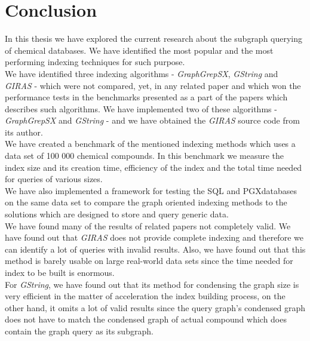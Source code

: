 \chapter*{Conclusion}

In this thesis we have explored the current research about the subgraph querying of chemical databases. We have identified the most popular and the most performing indexing techniques for such purpose.\\

We have identified three indexing algorithms - \textit{GraphGrepSX}, \textit{GString} and \textit{GIRAS} - which were not compared, yet, in any related paper and which won the performance tests in the benchmarks presented as a part of the papers which describes such algorithms. We have implemented two of these algorithms - \textit{GraphGrepSX} and \textit{GString} - and we have obtained the \textit{GIRAS} source code from its author.\\

We have created a benchmark of the mentioned indexing methods which uses a data set of 100 000 chemical compounds. In this benchmark we measure the index size and its creation time, efficiency of the index and the total time needed for queries of various sizes.\\

We have also implemented a framework for testing the SQL and PGX\linebreak databases on the same data set to compare the graph oriented indexing methods to the solutions which are designed to store and query generic data.\\

We have found many of the results of related papers not completely valid. We have found out that \textit{GIRAS} does not provide complete indexing and therefore we can identify a lot of queries with invalid results. Also, we have found out that this method is barely usable on large real-world data sets since the time needed for index to be built is enormous.\\

For \textit{GString}, we have found out that its method for condensing the graph size is very efficient in the matter of acceleration the index building process, on the other hand, it omits a lot of valid results since the query graph's condensed graph does not have to match the condensed graph of actual compound which does contain the graph query as its subgraph.\\

